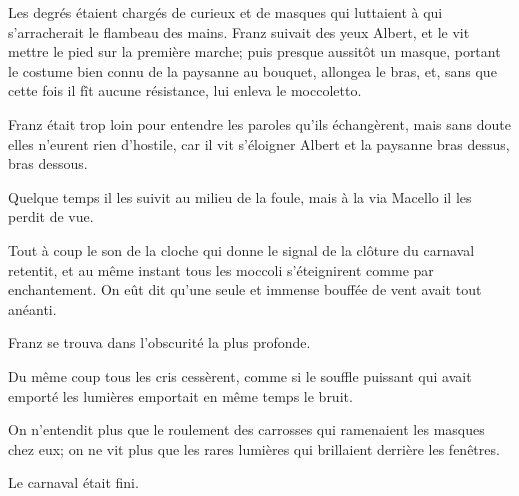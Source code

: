 Les degrés étaient chargés de curieux et de masques qui luttaient à qui s'arracherait le flambeau des mains. Franz suivait des yeux Albert, et le vit mettre le pied sur la première marche; puis presque aussitôt un masque, portant le costume bien connu de la paysanne au bouquet, allongea le bras, et, sans que cette fois il fît aucune résistance, lui enleva le moccoletto.  

Franz était trop loin pour entendre les paroles qu'ils échangèrent, mais sans doute elles n'eurent rien d'hostile, car il vit s'éloigner Albert et la paysanne bras dessus, bras dessous. 

Quelque temps il les suivit au milieu de la foule, mais à la via Macello il les perdit de vue. 

Tout à coup le son de la cloche qui donne le signal de la clôture du carnaval retentit, et au même instant tous les moccoli s'éteignirent comme par enchantement. On eût dit qu'une seule et immense bouffée de vent avait tout anéanti. 

Franz se trouva dans l'obscurité la plus profonde. 

Du même coup tous les cris cessèrent, comme si le souffle puissant qui avait emporté les lumières emportait en même temps le bruit. 

On n'entendit plus que le roulement des carrosses qui ramenaient les masques chez eux; on ne vit plus que les rares lumières qui brillaient derrière les fenêtres. 

Le carnaval était fini.